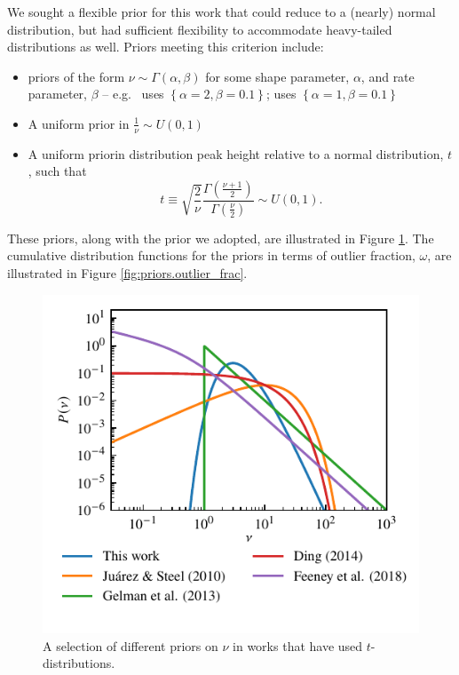 \documentclass[fleqn,usenatbib]{rasti}
\begin{document}
We sought a flexible prior for this work that could reduce to a (nearly) normal
distribution, but had sufficient flexibility to accommodate heavy-tailed
distributions as well. Priors meeting this criterion include:
\begin{itemize}
    \item priors of the form $\nu \sim \Gamma(\alpha, \beta)$ for
          some shape parameter, $\alpha$, and rate parameter, $\beta$ -- e.g.\
          \citet{Juarez:2010} uses $\left\{\alpha = 2, \beta = 0.1\right\}$;
          \citet{Ding:2014} uses $\left\{\alpha = 1, \beta = 0.1\right\}$
    \item A uniform prior in $\frac1\nu \sim U(0, 1)$ \citep{Gelman:2013}
    \item A uniform prior\footnotemark in distribution peak height relative to a normal
    distribution, $t$, such that
    \begin{equation}
        t \equiv \sqrt{\frac2\nu}\frac{\Gamma\left(\frac{\nu + 1}{2}\right)}{\Gamma\left(\frac{\nu}{2}\right)} \sim U(0, 1).
    \end{equation}
\end{itemize}
These priors, along with the prior we adopted, are illustrated in Figure
\ref{fig:priors.pdf}. The cumulative distribution functions for the priors in
terms of outlier fraction, $\omega$, are illustrated in Figure
\ref{fig:priors.outlier_frac}.

\begin{figure}
	\includegraphics[width=\columnwidth]{graphics/pdf_nu}
    \caption{A selection of different priors on $\nu$ in works that have used
    $t$-distributions.}
    \label{fig:priors.pdf}
\end{figure}
\end{document}
